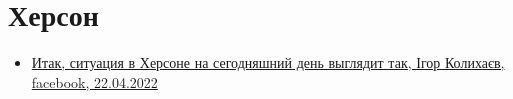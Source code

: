  
 
 
 
 

\section{Херсон}
\label{sec:topics.vojna.cities.herson}

\begin{itemize} %

\item \hyperlink{22_04_2022.fb.kolyhaev_igor.herson.mer.1.herson}{%
Итак, ситуация в Херсоне на сегодняшний день выглядит так, Ігор Колихаєв, facebook, 22.04.2022%
}

\end{itemize} %
